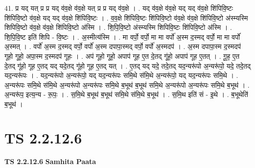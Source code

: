\documentclass[17pt]{extarticle}
\begin{document}
41. प्र यद् यत् प्र प्र यद् व॑व॒क्षे व॑व॒क्षे यत् प्र प्र यद् व॑व॒क्षे । . यद् व॑व॒क्षे व॑व॒क्षे यद् यद् व॑व॒क्षे शि॑पिवि॒ष्टः शि॑पिवि॒ष्टो व॑व॒क्षे यद् यद् व॑व॒क्षे शि॑पिवि॒ष्टः । . व॒व॒क्षे शि॑पिवि॒ष्टः शि॑पिवि॒ष्टो व॑व॒क्षे व॑व॒क्षे शि॑पिवि॒ष्टो अ॑स्म्यस्मि शिपिवि॒ष्टो व॑व॒क्षे व॑व॒क्षे शि॑पिवि॒ष्टो अ॑स्मि । . शि॒पि॒वि॒ष्टो अ॑स्म्यस्मि शिपिवि॒ष्टः शि॑पिवि॒ष्टो अ॑स्मि । . शि॒पि॒वि॒ष्ट इति॑ शिपि - वि॒ष्टः । . अ॒स्मीत्य॑स्मि । . मा वर्पो॒ वर्पो॒ मा मा वर्पो॑ अ॒स्म द॒स्मद् वर्पो॒ मा मा वर्पो॑ अ॒स्मत् । . वर्पो॑ अ॒स्म द॒स्मद् वर्पो॒ वर्पो॑ अ॒स्म दपापा॒स्मद् वर्पो॒ वर्पो॑ अ॒स्मदप॑ । . अ॒स्म दपापा॒स्म द॒स्मदप॑ गूहो गूहो॒ अपा॒स्म द॒स्मदप॑ गूहः । . अप॑ गूहो गूहो॒ अपाप॑ गूह ए॒त दे॒तद् गू॑हो॒ अपाप॑ गूह ए॒तत् । . गू॒ह॒ ए॒त दे॒तद् गू॑हो गूह ए॒तद् यद् यदे॒तद् गू॑हो गूह ए॒तद् यत् । . ए॒तद् यद् यदे॒ तदे॒तद् यद॒न्यरू॑पो अ॒न्यरू॑पो॒ यदे॒ तदे॒तद् यद॒न्यरू॑पः । . यद॒न्यरू॑पो अ॒न्यरू॑पो॒ यद् यद॒न्यरू॑पः समि॒थे स॑मि॒थे अ॒न्यरू॑पो॒ यद् यद॒न्यरू॑पः समि॒थे । . अ॒न्यरू॑पः समि॒थे स॑मि॒थे अ॒न्यरू॑पो अ॒न्यरू॑पः समि॒थे ब॒भूथ॑ ब॒भूथ॑ समि॒थे अ॒न्यरू॑पो अ॒न्यरू॑पः समि॒थे ब॒भूथ॑ । . अ॒न्यरू॑प॒ इत्य॒न्य - रू॒पः॒ । . स॒मि॒थे ब॒भूथ॑ ब॒भूथ॑ समि॒थे स॑मि॒थे ब॒भूथ॑ । . स॒मि॒थ इति॑ सं - इ॒थे । . ब॒भूथेति॑ ब॒भूथ॑ । \newline
\pagebreak
{}

\section{ TS 2.2.12.6 }

\textbf{TS 2.2.12.6 } \newline
\textbf{Samhita Paata} \newline
\end{document}
